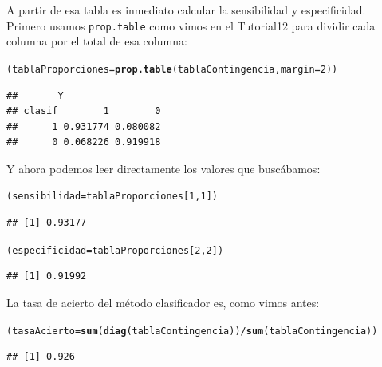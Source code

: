 \documentclass[10pt,a4paper]{article}\usepackage[]{graphicx}\usepackage[]{color}
\makeatletter
\newcommand{\hlnum}[1]{\textcolor[rgb]{0.686,0.059,0.569}{#1}}%
\newcommand{\hlopt}[1]{\textcolor[rgb]{0,0,0}{#1}}%
\newcommand{\hlstd}[1]{\textcolor[rgb]{0.345,0.345,0.345}{#1}}%
\newcommand{\hlkwb}[1]{\textcolor[rgb]{0.69,0.353,0.396}{#1}}%
\newcommand{\hlkwc}[1]{\textcolor[rgb]{0.333,0.667,0.333}{#1}}%
\newcommand{\hlkwd}[1]{\textcolor[rgb]{0.737,0.353,0.396}{\textbf{#1}}}%
\newenvironment{kframe}{%
 \def\at@end@of@kframe{}%
 \ifinner\ifhmode%
  \def\at@end@of@kframe{\end{minipage}}%
  \begin{minipage}{\columnwidth}%
 \fi\fi%
 \def\FrameCommand##1{\hskip\@totalleftmargin \hskip-\fboxsep
 \colorbox{shadecolor}{##1}\hskip-\fboxsep
     \hskip-\linewidth \hskip-\@totalleftmargin \hskip\columnwidth}%
 \MakeFramed {\advance\hsize-\width
   \@totalleftmargin\z@ \linewidth\hsize
   \@setminipage}}%
 {\par\unskip\endMakeFramed%
 \at@end@of@kframe}
\newenvironment{knitrout}{}{} %
\makeatother
\begin{document}
A partir de esa tabla es inmediato calcular la sensibilidad y especificidad. Primero usamos {\tt prop.table} como vimos en el Tutorial12 para dividir cada columna por el total de esa columna:

\begin{knitrout}
\color{fgcolor}\begin{kframe}
\begin{alltt}
\hlstd{(tablaProporciones} \hlkwb{=} \hlkwd{prop.table}\hlstd{(tablaContingencia,} \hlkwc{margin} \hlstd{=} \hlnum{2}\hlstd{))}
\end{alltt}
\begin{verbatim}
##       Y
## clasif        1        0
##      1 0.931774 0.080082
##      0 0.068226 0.919918
\end{verbatim}
\end{kframe}
\end{knitrout}

Y ahora podemos leer directamente los valores que buscábamos:

\begin{knitrout}
\color{fgcolor}\begin{kframe}
\begin{alltt}
\hlstd{(sensibilidad} \hlkwb{=} \hlstd{tablaProporciones[}\hlnum{1}\hlstd{,} \hlnum{1}\hlstd{])}
\end{alltt}
\begin{verbatim}
## [1] 0.93177
\end{verbatim}
\begin{alltt}
\hlstd{(especificidad} \hlkwb{=} \hlstd{tablaProporciones[}\hlnum{2}\hlstd{,} \hlnum{2}\hlstd{])}
\end{alltt}
\begin{verbatim}
## [1] 0.91992
\end{verbatim}
\end{kframe}
\end{knitrout}

La tasa de acierto del método clasificador es, como vimos antes:

\begin{knitrout}
\color{fgcolor}\begin{kframe}
\begin{alltt}
\hlstd{(tasaAcierto} \hlkwb{=} \hlkwd{sum}\hlstd{(}\hlkwd{diag}\hlstd{(tablaContingencia))} \hlopt{/} \hlkwd{sum}\hlstd{(tablaContingencia))}
\end{alltt}
\begin{verbatim}
## [1] 0.926
\end{verbatim}
\end{kframe}
\end{knitrout}
\end{document}
